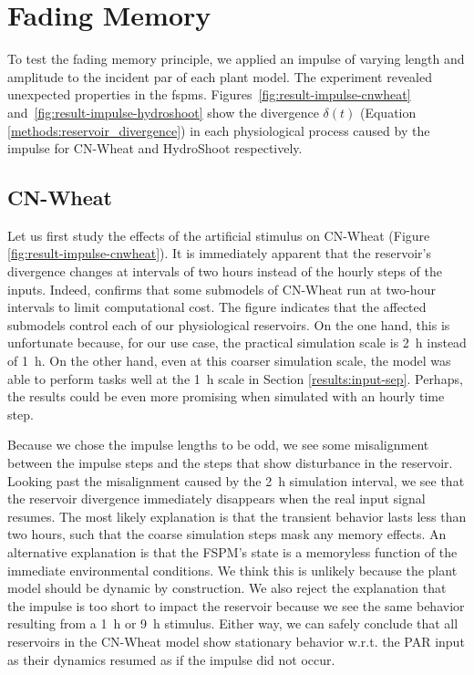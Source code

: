 \section{Fading Memory}

To test the fading memory principle, we applied an impulse of varying length and amplitude to the incident \acrshort{par} of each plant model.
The experiment revealed unexpected properties in the \acrshort{fspm}s.
\mbox{Figures \ref{fig:result-impulse-cnwheat}} \mbox{and \ref{fig:result-impulse-hydroshoot}} show the divergence $\delta(t)$ (Equation \ref{methods:reservoir_divergence}) in each physiological process caused by the impulse for CN-Wheat and HydroShoot respectively.

\subsection{CN-Wheat}

Let us first study the effects of the artificial stimulus on CN-Wheat (Figure \ref{fig:result-impulse-cnwheat}).
It is immediately apparent that the reservoir's divergence changes at intervals of two hours instead of the hourly steps of the inputs.
Indeed, \citet{barillot_cn-wheat_2016-1} confirms that some submodels of CN-Wheat run at two-hour intervals to limit computational cost.
The figure indicates that the affected submodels control each of our physiological reservoirs.
On the one hand, this is unfortunate because, for our use case, the practical simulation scale is \SI{2}{\hour} instead of \SI{1}{\hour}.
On the other hand, even at this coarser simulation scale, the model was able to perform tasks well at the \SI{1}{h} scale in Section \ref{results:input-sep}. Perhaps, the results could be even more promising when simulated with an hourly time step.

Because we chose the impulse lengths to be odd, we see some misalignment between the impulse steps and the steps that show disturbance in the reservoir.
Looking past the misalignment caused by the \SI{2}{\hour} simulation interval, we see that the reservoir divergence immediately disappears when the real input signal resumes.
The most likely explanation is that the transient behavior lasts less than two hours, such that the coarse simulation steps mask any memory effects.
An alternative explanation is that the FSPM's state is a memoryless function of the immediate environmental conditions. 
We think this is unlikely because the plant model should be dynamic by construction.
We also reject the explanation that the impulse is too short to impact the reservoir because we see the same behavior resulting from a \SI{1}{\hour} or \SI{9}{\hour} stimulus.
Either way, we can safely conclude that all reservoirs in the CN-Wheat model show stationary behavior w.r.t. the PAR input as their dynamics resumed as if the impulse did not occur.

